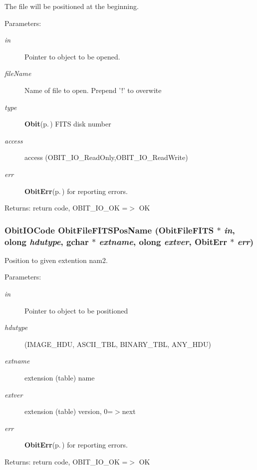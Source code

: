 The file will be positioned at the beginning. \begin{Desc}
\item[Parameters:]
\begin{description}
\item[{\em in}]Pointer to object to be opened. \item[{\em file\-Name}]Name of file to open. Prepend '!' to overwite \item[{\em type}]{\bf Obit}{\rm (p.\,\pageref{structObit})} FITS disk number \item[{\em access}]access (OBIT\_\-IO\_\-Read\-Only,OBIT\_\-IO\_\-Read\-Write) \item[{\em err}]{\bf Obit\-Err}{\rm (p.\,\pageref{structObitErr})} for reporting errors. \end{description}
\end{Desc}
\begin{Desc}
\item[Returns:]return code, OBIT\_\-IO\_\-OK =$>$ OK \end{Desc}
\subsubsection{\setlength{\rightskip}{0pt plus 5cm}Obit\-IOCode Obit\-File\-FITSPos\-Name ({\bf Obit\-File\-FITS} $\ast$ {\em in}, {\bf olong} {\em hdutype}, gchar $\ast$ {\em extname}, {\bf olong} {\em extver}, {\bf Obit\-Err} $\ast$ {\em err})}\label{ObitFileFITS_8c_a16}


Position to given extention nam2. 

\begin{Desc}
\item[Parameters:]
\begin{description}
\item[{\em in}]Pointer to object to be positioned \item[{\em hdutype}](IMAGE\_\-HDU, ASCII\_\-TBL, BINARY\_\-TBL, ANY\_\-HDU) \item[{\em extname}]extension (table) name \item[{\em extver}]extension (table) version, 0=$>$next \item[{\em err}]{\bf Obit\-Err}{\rm (p.\,\pageref{structObitErr})} for reporting errors. \end{description}
\end{Desc}
\begin{Desc}
\item[Returns:]return code, OBIT\_\-IO\_\-OK =$>$ OK \end{Desc}
